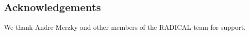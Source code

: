 \documentclass{bmcart}
\begin{document}
\subsection*{Acknowledgements}
We thank Andre Merzky and other members of the RADICAL team for support.








\end{document}
